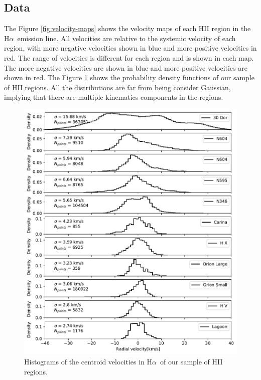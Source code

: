 \documentclass[fleqn,usenatbib, useAMS, a4paper]{mnras}
\newcommand\halpha{H${\alpha}$}
\begin{document}
\subsection{Data}

The Figure \ref{fig:velocity-maps} shows the velocity maps of each HII region in the \halpha\ emission line.
All velocities are relative to the systemic velocity of each region, with more negative velocities shown in blue and more positive velocities in red. The range of velocities is different for each region and is shown in each map. The more negative velocities are shown in blue and more positive velocities are shown in red.
The Figure \ref{fig:hist} shows the probability density functions of our sample of HII regions.
All the distributions are far from being consider Gaussian, implying that there are multiple kinematics components in the regions.

\begin{figure}
 \centering
 \includegraphics[width=5in]{Figures/Hist/Hist}\par
 \caption{Histograms of the centroid velocities in \halpha\ of our sample of HII regions. }
 \label{fig:hist}
\end{figure}
\end{document}
